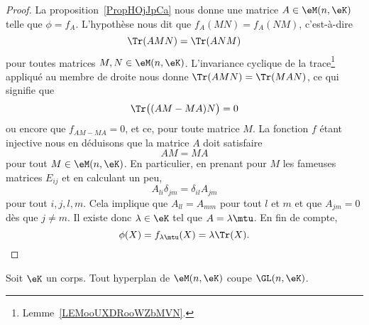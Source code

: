 \begin{proof}
    La proposition~\ref{PropHOjJpCa} nous donne une matrice \( A\in \eM(n,\eK)\) telle que \( \phi=f_A\). L'hypothèse nous dit que \( f_A(MN)=f_A(NM)\), c'est-à-dire
    \begin{equation}
        \Tr(AMN)=\Tr(ANM)
    \end{equation}
    pour toutes matrices \( M, N\in \eM(n,\eK)\). L'invariance cyclique de la trace\footnote{Lemme~\ref{LEMooUXDRooWZbMVN}.} appliqué au membre de droite nous donne \( \Tr(AMN)=\Tr(MAN)\), ce qui signifie que
    \begin{equation}
        \Tr\big( (AM-MA)N \big)=0
    \end{equation}
    ou encore que \( f_{AM-MA}=0\), et ce, pour toute matrice \( M\). La fonction \( f\) étant injective nous en déduisons que la matrice \( A\) doit satisfaire
    \begin{equation}
        AM=MA
    \end{equation}
    pour tout \( M\in\eM(n,\eK)\). En particulier, en prenant pour \( M \) les fameuses matrices \( E_{ij}\) et en calculant un peu,
    \begin{equation}
        A_{li}\delta_{jm}=\delta_{il}A_{jm}
    \end{equation}
    pour tout \( i,j,l,m\). Cela implique que \( A_{ll}=A_{mm}\) pour tout \( l\) et \( m\) et que \( A_{jm}=0\) dès que \( j\neq m\). Il existe donc \( \lambda\in \eK\) tel que \( A=\lambda\mtu\). En fin de compte,
    \begin{equation}
        \phi(X)=f_{\lambda\mtu}(X)=\lambda\Tr(X).
    \end{equation}
\end{proof}

\begin{corollary}       \label{CorICUOooPsZQrg}
    Soit \( \eK\) un corps. Tout hyperplan de \( \eM(n,\eK)\) coupe \( \GL(n,\eK)\).
\end{corollary}

